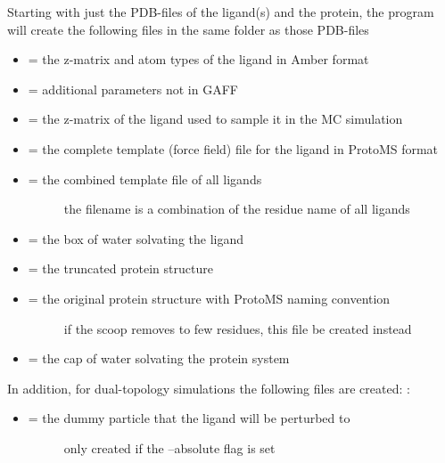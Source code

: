\documentclass[letterpaper,10pt,english]{manual}
\begin{document}
Starting with just the PDB-files of the ligand(s) and the protein, the program will create the following files in the same folder as those PDB-files
\begin{itemize}
\item {} 
 = the z-matrix and atom types of the ligand in Amber format

\item {} 
 = additional parameters not in GAFF

\item {} 
 = the z-matrix of the ligand used to sample it in the MC simulation

\item {} 
 = the complete template (force field) file for the ligand in ProtoMS format

\item {} \begin{description}
\item[{ = the combined template file of all ligands}] \leavevmode
the filename is a combination of the residue name of all ligands

\end{description}

\item {} 
 = the box of water solvating the ligand

\item {} 
 = the truncated protein structure

\item {} \begin{description}
\item[{ = the original protein structure with ProtoMS naming convention}] \leavevmode
if the scoop removes to few residues, this file be created instead

\end{description}

\item {} 
 = the cap of water solvating the protein system

\end{itemize}

In addition, for dual-topology simulations the following files are created: :
\begin{itemize}
\item {} \begin{description}
\item[{ = the dummy particle that the ligand will be perturbed to}] \leavevmode
only created if the --absolute flag is set

\end{description}

\end{itemize}
\end{document}
